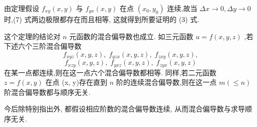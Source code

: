 由定理假设 \({f}_{xy}\left( {x,y}\right)\) 与 \({f}_{yx}\left( {x,y}\right)\) 在点 \(\left( {{x}_{0},{y}_{0}}\right)\) 连续,故当 \({\Delta x} \rightarrow  0,{\Delta y} \rightarrow  0\) 时,(7) 式两边极限都存在而且相等, 这就得到所要证明的 (3) 式.

这个定理的结论对 \(n\) 元函数的混合偏导数也成立. 如三元函数 \(u = f\left( {x,y,z}\right)\) ,若下述六个三阶混合偏导数
\[
{f}_{xyz}\left( {x,y,z}\right) ,\;{f}_{yzx}\left( {x,y,z}\right) ,\;{f}_{zxy}\left( {x,y,z}\right) ,
\]
\[
{f}_{xzy}\left( {x,y,z}\right) ,\;{f}_{yxz}\left( {x,y,z}\right) ,\;{f}_{zyx}\left( {x,y,z}\right)
\]
在某一点都连续,则在这一点六个混合偏导数都相等. 同样,若二元函数 \(z = f\left( {x,y}\right)\) 在点 (x, y)存在直到 \(n\) 阶的连续混合偏导数,则在这一点 \(m\left( { \leq  n}\right)\) 阶混合偏导数都与顺序无关.

今后除特别指出外, 都假设相应阶数的混合偏导数连续, 从而混合偏导数与求导顺序无关.

